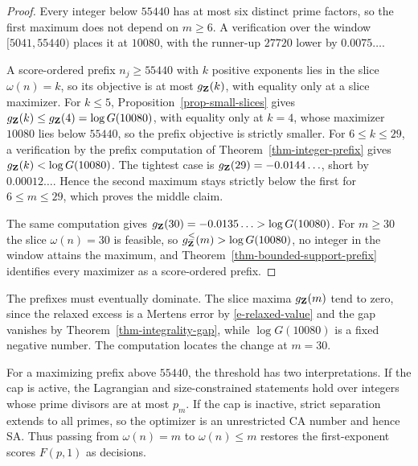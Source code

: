 \begin{proof}
Every integer below \(55440\) has at most six distinct prime factors,
so the first maximum does not depend on \(m\geq6\). A verification over
the window \([5041,55440)\) places it at \(10080\), with the runner-up
\(27720\) lower by \(0.0075\ldots\).

A score-ordered prefix \(n_j\geq55440\) with \(k\) positive exponents
lies in the slice \(\omega(n)=k\), so its objective is at most
\(g_{\mathbf{Z}}(k)\), with equality only at a slice maximizer. For
\(k\leq5\), Proposition~\ref{prop-small-slices} gives
\(g_{\mathbf{Z}}(k)\leq g_{\mathbf{Z}}(4)=\log G(10080)\), with equality
only at \(k=4\), whose maximizer \(10080\) lies below \(55440\), so the
prefix objective is strictly smaller. For \(6\leq k\leq29\), a
verification by the prefix computation of
Theorem~\ref{thm-integer-prefix} gives
\(g_{\mathbf{Z}}(k)<\log G(10080)\). The tightest case is
\(g_{\mathbf{Z}}(29)=-0.0144\ldots\), short by \(0.00012\ldots\). Hence
the second maximum stays strictly below the first for
\(6\leq m\leq29\), which proves the middle claim.

The same computation gives
\(g_{\mathbf{Z}}(30)=-0.0135\ldots>\log G(10080)\). For \(m\geq30\) the
slice \(\omega(n)=30\) is feasible, so
\(g_{\mathbf{Z}}^{\leq}(m)>\log G(10080)\), no integer in the window
attains the maximum, and Theorem~\ref{thm-bounded-support-prefix}
identifies every maximizer as a score-ordered prefix.
\end{proof}

The prefixes must eventually dominate. The slice maxima
\(g_{\mathbf{Z}}(m)\) tend to zero, since the relaxed excess is a
Mertens error by \eqref{e-relaxed-value} and the gap vanishes by
Theorem~\ref{thm-integrality-gap}, while \(\log G(10080)\) is a fixed
negative number. The computation locates the change at \(m=30\).

For a maximizing prefix above \(55440\), the threshold has two
interpretations. If the cap is active, the Lagrangian and size-constrained
statements hold over integers whose prime divisors are at most \(p_m\). If
the cap is inactive, strict separation extends to all primes, so the
optimizer is an unrestricted CA number and hence SA. Thus passing from
\(\omega(n)=m\) to \(\omega(n)\leq m\) restores the first-exponent scores
\(F(p,1)\) as decisions.

